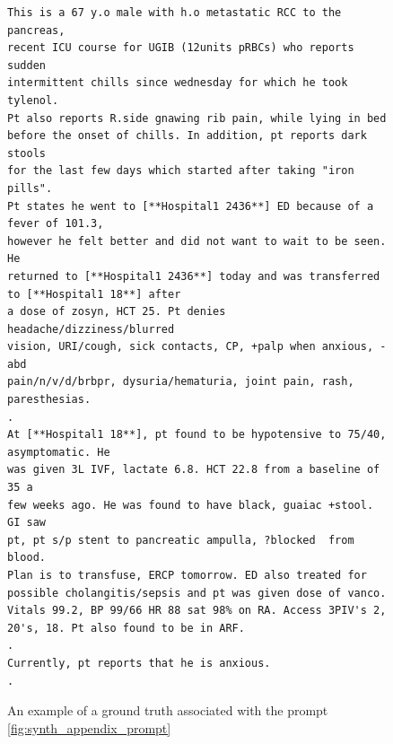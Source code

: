 \begin{figure}[hbt]
    \centering
    \begin{Verbatim}[breaklines=true, frame=single]
    This is a 67 y.o male with h.o metastatic RCC to the pancreas,
recent ICU course for UGIB (12units pRBCs) who reports sudden
intermittent chills since wednesday for which he took tylenol.
Pt also reports R.side gnawing rib pain, while lying in bed
before the onset of chills. In addition, pt reports dark stools
for the last few days which started after taking "iron pills".
Pt states he went to [**Hospital1 2436**] ED because of a fever of 101.3,
however he felt better and did not want to wait to be seen. He
returned to [**Hospital1 2436**] today and was transferred to [**Hospital1 18**] after
a dose of zosyn, HCT 25. Pt denies headache/dizziness/blurred
vision, URI/cough, sick contacts, CP, +palp when anxious, -abd
pain/n/v/d/brbpr, dysuria/hematuria, joint pain, rash,
paresthesias.
.
At [**Hospital1 18**], pt found to be hypotensive to 75/40, asymptomatic. He
was given 3L IVF, lactate 6.8. HCT 22.8 from a baseline of 35 a
few weeks ago. He was found to have black, guaiac +stool. GI saw
pt, pt s/p stent to pancreatic ampulla, ?blocked  from blood.
Plan is to transfuse, ERCP tomorrow. ED also treated for
possible cholangitis/sepsis and pt was given dose of vanco.
Vitals 99.2, BP 99/66 HR 88 sat 98% on RA. Access 3PIV's 2,
20's, 18. Pt also found to be in ARF.
.
Currently, pt reports that he is anxious.
.
    \end{Verbatim}
    \caption{An example of a ground truth associated with the prompt \ref{fig:synth_appendix_prompt}}
    \label{fig:synth_appendix_ground}
\end{figure}

